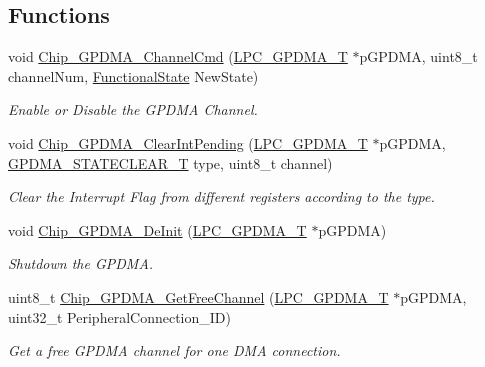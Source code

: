 \subsection*{Functions}
\begin{DoxyCompactItemize}
\item 
void \hyperlink{group__GPDMA__17XX__40XX_gae93a1b9cb8ee1a04176ce51a9a4ad073}{Chip\+\_\+\+G\+P\+D\+M\+A\+\_\+\+Channel\+Cmd} (\hyperlink{structLPC__GPDMA__T}{L\+P\+C\+\_\+\+G\+P\+D\+M\+A\+\_\+T} $\ast$p\+G\+P\+D\+MA, uint8\+\_\+t channel\+Num, \hyperlink{group__LPC__Types__Public__Types_gac9a7e9a35d2513ec15c3b537aaa4fba1}{Functional\+State} New\+State)
\begin{DoxyCompactList}\small\item\em Enable or Disable the G\+P\+D\+MA Channel. \end{DoxyCompactList}\item 
void \hyperlink{group__GPDMA__17XX__40XX_ga94c9bdb806ce700f0c04deeec0da142e}{Chip\+\_\+\+G\+P\+D\+M\+A\+\_\+\+Clear\+Int\+Pending} (\hyperlink{structLPC__GPDMA__T}{L\+P\+C\+\_\+\+G\+P\+D\+M\+A\+\_\+T} $\ast$p\+G\+P\+D\+MA, \hyperlink{group__GPDMA__17XX__40XX_gabbb281ef4b818f2e60167cf766f94fdb}{G\+P\+D\+M\+A\+\_\+\+S\+T\+A\+T\+E\+C\+L\+E\+A\+R\+\_\+T} type, uint8\+\_\+t channel)
\begin{DoxyCompactList}\small\item\em Clear the Interrupt Flag from different registers according to the type. \end{DoxyCompactList}\item 
void \hyperlink{group__GPDMA__17XX__40XX_ga673cc6cab2ad87185f5f5d0ff8424075}{Chip\+\_\+\+G\+P\+D\+M\+A\+\_\+\+De\+Init} (\hyperlink{structLPC__GPDMA__T}{L\+P\+C\+\_\+\+G\+P\+D\+M\+A\+\_\+T} $\ast$p\+G\+P\+D\+MA)
\begin{DoxyCompactList}\small\item\em Shutdown the G\+P\+D\+MA. \end{DoxyCompactList}\item 
uint8\+\_\+t \hyperlink{group__GPDMA__17XX__40XX_ga55ff3d61ec382dbec4775bed2db2cde2}{Chip\+\_\+\+G\+P\+D\+M\+A\+\_\+\+Get\+Free\+Channel} (\hyperlink{structLPC__GPDMA__T}{L\+P\+C\+\_\+\+G\+P\+D\+M\+A\+\_\+T} $\ast$p\+G\+P\+D\+MA, uint32\+\_\+t Peripheral\+Connection\+\_\+\+ID)
\begin{DoxyCompactList}\small\item\em Get a free G\+P\+D\+MA channel for one D\+MA connection. \end{DoxyCompactList}\item 

\end{DoxyCompactItemize}
